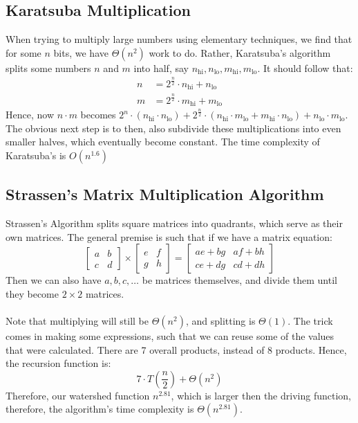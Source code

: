 \documentclass[journal, letterpaper]{IEEEtran}
\begin{document}
  \subsection{Karatsuba Multiplication}
  When trying to multiply large numbers using elementary techniques, we find that for some $n$ bits, we have $\Theta(n^2)$ work
  to do. Rather, Karatsuba's algorithm splits some numbers $n$ and $m$ into half, say $n_{\text{hi}}, n_{\text{lo}}, 
  m_{\text{hi}}, m_{\text{lo}}$. It should
  follow that:
  \begin{align*}
    n &= 2^{\frac{n}{2}}\cdot n_{\text{hi}} + n_{\text{lo}} \\ 
    m &= 2^{\frac{n}{2}}\cdot m_{\text{hi}} + m_{\text{lo}}
  \end{align*}
  Hence, now $n \cdot m$ becomes 
  $2^n\cdot (n_\text{hi} \cdot n_\text{lo}) + 2^{\frac{n}{2}}\cdot (n_{\text{hi}}\cdot m_{\text{lo}} + m_{\text{hi}}\cdot n_{\text{lo}}) + 
  n_{\text{lo}}\cdot m_{\text{lo}}$. The obvious next step is to then, also subdivide these multiplications into even smaller 
  halves, which eventually become constant. The time complexity of Karatsuba's is $O(n^{1.6})$
  \subsection{Strassen's Matrix Multiplication Algorithm}
  Strassen's Algorithm splits square matrices into quadrants, which serve as their own matrices. The general premise is such that if
  we have a matrix equation:
  \[ \begin{bmatrix} a & b \\ c & d \end{bmatrix} \times \begin{bmatrix} e & f \\ g & h \end{bmatrix} = 
  \begin{bmatrix} ae + bg & af + bh \\ ce + dg & cd + dh \end{bmatrix}  \]
  Then we can also have $a, b, c, \ldots$ be matrices themselves, and divide them until they become $2\times 2$ matrices. \\ \\
  Note that multiplying will still be $\Theta(n^2)$, and splitting is $\Theta(1)$. The trick comes in making some
  expressions, such that we can reuse some of the values that were calculated. There are 7 overall products, instead of 8 products.
  Hence, the recursion function is:
  \[ 7\cdot T(\frac{n}{2}) + \Theta(n^2)\]
  Therefore, our watershed function $n^{2.81}$, which is larger then the driving function, therefore, the algorithm's time complexity
  is $\Theta(n^{2.81})$.
\end{document}
